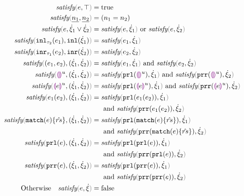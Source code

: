 \begin{subequations}\label{defn:satisfy}
\begin{align}
  \fsatisfy{e}{\ctruth} ={}& \true \label{defn:satisfy-truth}\\
  \fsatisfy{\hnum{n_1}}{\cnum{n_2}} ={}& (n_1 = n_2) \label{defn:num-satisfy-num}\\
  \fsatisfy{e}{\cor{\hxi_1}{\hxi_2}} ={}& \fsatisfy{e}{\hxi_1} \text{ or } \fsatisfy{e}{\hxi_2} \label{defn:satisfy-or}\\
  \fsatisfy{\hinl{\tau_2}{e_1}}{\cinl{\hxi_1}} ={}& \fsatisfy{e_1}{\hxi_1} \label{defn:inl-satisfy-inl}\\
  \fsatisfy{\hinr{\tau_1}{e_2}}{\cinr{\hxi_2}} ={}& \fsatisfy{e_2}{\hxi_2} \label{defn:inr-satisfy-inr}\\
  \fsatisfy{\hpair{e_1}{e_2}}{\cpair{\hxi_1}{\hxi_2}} ={}& \fsatisfy{e_1}{\hxi_1} \text{ and } \fsatisfy{e_2}{\hxi_2} \label{defn:pair-satisfy-pair}\\
  \fsatisfy{\hehole{u}}{\cpair{\hxi_1}{\hxi_2}} ={}& \fsatisfy{\hprl{\hehole{u}}}{\hxi_1} \text{ and } \fsatisfy{\hprr{\hehole{u}}}{\hxi_2}
  \label{defn:ehole-satisfy-pair} \\
  \fsatisfy{\hhole{e}{u}}{\cpair{\hxi_1}{\hxi_2}} ={}& \fsatisfy{\hprl{\hhole{e}{u}}}{\hxi_1} \text{ and } \fsatisfy{\hprr{\hhole{e}{u}}}{\hxi_2}
  \label{defn:hole-satisfy-pair} \\
  \fsatisfy{\hap{e_1}{e_2}}{\cpair{\hxi_1}{\hxi_2}} ={}& \fsatisfy{\hprl{\hap{e_1}{e_2}}}{\hxi_1} \notag\\
  &\text{ and } \fsatisfy{\hprr{\hap{e_1}{e_2}}}{\hxi_2}
  \label{defn:ap-satisfy-pair} \\
  \fsatisfy{\hmatch{e}{\zrules}}{\cpair{\hxi_1}{\hxi_2}} ={}& \fsatisfy{\hprl{\hmatch{e}{\zrules}}}{\hxi_1} \notag\\
  &\text{ and } \fsatisfy{\hprr{\hmatch{e}{\zrules}}}{\hxi_2}
  \label{defn:match-satisfy-pair} \\
  \fsatisfy{\hprl{e}}{\cpair{\hxi_1}{\hxi_2}} ={}& \fsatisfy{\hprl{\hprl{e}}}{\hxi_1} \notag\\
  &\text{ and } \fsatisfy{\hprr{\hprl{e}}}{\hxi_2}
  \label{defn:prl-satisfy-pair} \\
  \fsatisfy{\hprr{e}}{\cpair{\hxi_1}{\hxi_2}} ={}& \fsatisfy{\hprl{\hprr{e}}}{\hxi_1} \notag\\
  &\text{ and } \fsatisfy{\hprr{\hprr{e}}}{\hxi_2}
  \label{defn:prr-satisfy-pair} \\
  \text{Otherwise}\quad \fsatisfy{e}{\hxi} ={}& \false \label{defn:not-satisfy}
\end{align}
\end{subequations}

